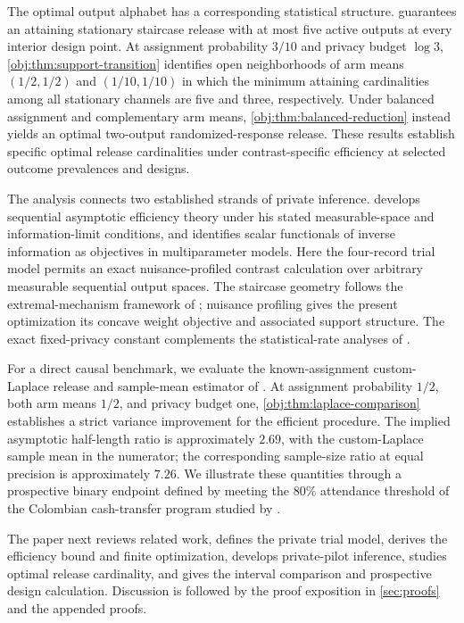 \documentclass[11pt]{article}
\begin{document}
The optimal output alphabet has a corresponding statistical structure.  guarantees an attaining stationary staircase release with at most five active outputs at every interior design point. At assignment probability \(3/10\) and privacy budget \(\log 3\), \cref{obj:thm:support-transition} identifies open neighborhoods of arm means \((1/2,1/2)\) and \((1/10,1/10)\) in which the minimum attaining cardinalities among all stationary channels are five and three, respectively. Under balanced assignment and complementary arm means, \cref{obj:thm:balanced-reduction} instead yields an optimal two-output randomized-response release. These results establish specific optimal release cardinalities under contrast-specific efficiency at selected outcome prevalences and designs.

The analysis connects two established strands of private inference.  develops sequential asymptotic efficiency theory under his stated measurable-space and information-limit conditions, and identifies scalar functionals of inverse information as objectives in multiparameter models. Here the four-record trial model permits an exact nuisance-profiled contrast calculation over arbitrary measurable sequential output spaces. The staircase geometry follows the extremal-mechanism framework of \citet[Theorems 2 and 4]{KairouzOhViswanath2016}; nuisance profiling gives the present optimization its concave weight objective and associated support structure. The exact fixed-privacy constant complements the statistical-rate analyses of \citet{DuchiJordanWainwright2018,Rohde2020,Duchi2024}.

For a direct causal benchmark, we evaluate the known-assignment custom-Laplace release and sample-mean estimator of \citet[Sections 3.1 and 3.3, Theorem 7, and Appendix A.5]{OhnishiAwan2025}. At assignment probability \(1/2\), both arm means \(1/2\), and privacy budget one, \cref{obj:thm:laplace-comparison} establishes a strict variance improvement for the efficient procedure. The implied asymptotic half-length ratio is approximately \(2.69\), with the custom-Laplace sample mean in the numerator; the corresponding sample-size ratio at equal precision is approximately \(7.26\). We illustrate these quantities through a prospective binary endpoint defined by meeting the \(80\%\) attendance threshold of the Colombian cash-transfer program studied by \citet{BarreraOsorioEtAl2011}.

The paper next reviews related work, defines the private trial model, derives the efficiency bound and finite optimization, develops private-pilot inference, studies optimal release cardinality, and gives the interval comparison and prospective design calculation. Discussion is followed by the proof exposition in \cref{sec:proofs} and the appended proofs.
\end{document}
